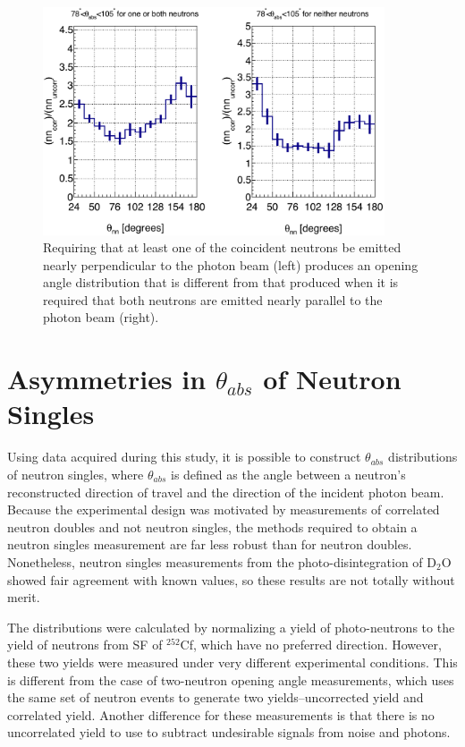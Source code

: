 \begin{figure}
\centering
\includegraphics[width=0.9\textwidth]{Content/Results/theta_abs_two-neutron.png}
\caption{Requiring that at least one of the coincident neutrons be emitted nearly perpendicular to the photon beam (left) produces an opening angle distribution that is different from that produced when it is required that both neutrons are emitted nearly parallel to the photon beam (right).}
\label{fig:theta_abs_two_neutron}
\end{figure}
\FloatBarrier 

\section{Asymmetries in $\theta_{abs}$ of Neutron Singles}
Using data acquired during this study, it is possible to construct $\theta_{abs}$ distributions of neutron singles, where $\theta_{abs}$ is defined as the angle between a neutron's reconstructed direction of travel and the direction of the incident photon beam.
Because the experimental design was motivated by measurements of correlated neutron doubles and not neutron singles, the methods required to obtain a neutron singles measurement are far less robust than for neutron doubles.
Nonetheless, neutron singles measurements from the photo-disintegration of D$_{2}$O showed fair agreement with known values, so these results are not totally without merit.

The distributions were calculated by normalizing a yield of photo-neutrons to the yield of neutrons from SF of $^{252}$Cf, which have no preferred direction.
However, these two yields were measured under very different experimental conditions.
This is different from the case of two-neutron opening angle measurements, which uses the same set of neutron events to generate two yields--uncorrected yield and correlated yield.
Another difference for these measurements is that there is no uncorrelated yield to use to subtract undesirable signals from noise and photons.

